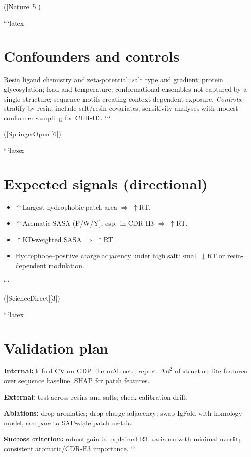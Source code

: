 ([Nature][5])

```latex
\section*{Confounders and controls}

Resin ligand chemistry and zeta-potential; salt type and gradient; protein glycosylation; load and temperature; conformational ensembles not captured by a single structure; sequence motifs creating context-dependent exposure.
\textit{Controls}: stratify by resin; include salt/resin covariates; sensitivity analyses with modest conformer sampling for CDR-H3.
```

([SpringerOpen][6])

```latex
\section*{Expected signals (directional)}

\begin{itemize}\itemsep0.2em
\item $\uparrow$Largest hydrophobic patch area $\Rightarrow$ $\uparrow$RT.
\item $\uparrow$Aromatic SASA (F/W/Y), esp.\ in CDR-H3 $\Rightarrow$ $\uparrow$RT.
\item $\uparrow$KD-weighted SASA $\Rightarrow$ $\uparrow$RT.
\item Hydrophobe–positive charge adjacency under high salt: small $\downarrow$RT or resin-dependent modulation.
\end{itemize}
```

([ScienceDirect][3])

```latex
\section*{Validation plan}

\textbf{Internal:} k-fold CV on GDP-like mAb sets; report $\Delta R^2$ of structure-lite features over sequence baseline, SHAP for patch features.

\textbf{External:} test across resins and salts; check calibration drift.

\textbf{Ablations:} drop aromatics; drop charge-adjacency; swap IgFold with homology model; compare to SAP-style patch metric.

\textbf{Success criterion:} robust gain in explained RT variance with minimal overfit; consistent aromatic/CDR-H3 importance.
```

